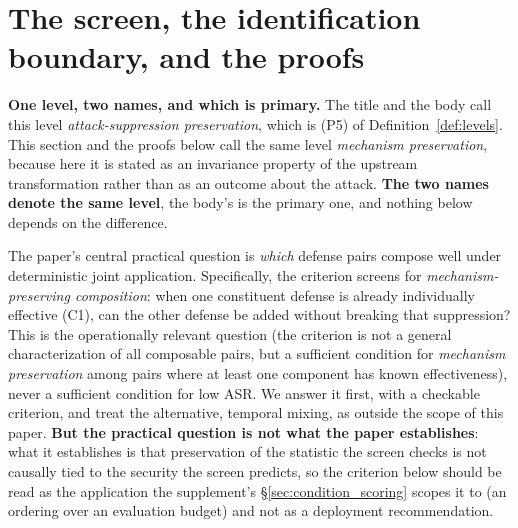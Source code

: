 \documentclass{article}
\begin{document}
\section{The screen, the identification boundary, and the proofs}
\label{sec:composability_criterion}
\label{app:conditions}


\noindent \textbf{One level, two names, and which is primary.} The title and the body call this level
\emph{attack-suppression preservation}, which is (P5) of Definition~\ref{def:levels}. This section and the
proofs below call the same level \emph{mechanism preservation}, because here it is stated as an invariance
property of the upstream transformation rather than as an outcome about the attack. \textbf{The two names
denote the same level}, the body's is the primary one, and nothing below depends on the difference.

The paper's central practical question is \emph{which} defense pairs compose well under deterministic joint application. Specifically, the criterion screens for \emph{mechanism-preserving composition}: when one constituent defense is already individually effective (C1), can the other defense be added without breaking that suppression? This is the operationally relevant question (the criterion is not a general characterization of all composable pairs, but a sufficient condition for \emph{mechanism preservation} among pairs where at least one component has known effectiveness), never a sufficient condition for low ASR. We answer it first, with a checkable criterion, and treat the alternative, temporal mixing, as outside the scope of this paper. \textbf{But the practical question is not what the paper establishes}: what it establishes is that preservation of the statistic the screen checks is not causally tied to the security the screen predicts, so the criterion below should be read as the application the supplement's §\ref{sec:condition_scoring} scopes it to (an ordering over an evaluation budget) and not as a deployment recommendation.
\end{document}

